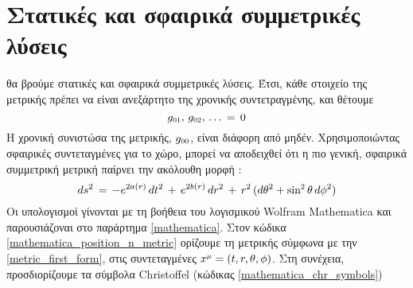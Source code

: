 \section{Στατικές και σφαιρικά συμμετρικές λύσεις}
θα βρούμε στατικές και σφαιρικά συμμετρικές λύσεις. 
Έτσι, κάθε στοιχείο της μετρικής πρέπει να είναι ανεξάρτητο της χρονικής συντετραγμένης, και θέτουμε 
\begin{equation*}
\g{0}{1},\,\g{0}{2},\,\dots\,=\,0
\end{equation*}
Η χρονική συνιστώσα της μετρικής, $\g{0}{0}$, είναι διάφορη από μηδέν. 
Χρησιμοποιώντας σφαιρικές συντεταγμένες για το χώρο, μπορεί να αποδειχθεί ότι η πιο γενική, σφαιρικά συμμετρική μετρική παίρνει την ακόλουθη μορφή \cite{Weinberg:100595}: 
\begin{equation}\label{metric_first_form}
    ds^2 \,=\, -e^{2a(r)}\,dt^2 \,+\, e^{2b(r)}\,dr^2 \,+\, r^2\,(d\theta^2 + \sin\superscr{2}\theta\,d\phi^2)
\end{equation}
Οι υπολογισμοί γίνονται με τη βοήθεια του λογισμικού Wolfram Mathematica και παρουσιάζοναι στο παράρτημα \ref{mathematica}. Στον κώδικα \ref{mathematica_position_n_metric} ορίζουμε τη μετρικής σύμφωνα με την \eqref{metric_first_form}, στις συντεταγμένες $x\superscr{\mu}=(t,r,\theta,\phi)$. Στη συνέχεια, προσδιορίζουμε τα σύμβολα Christoffel (κώδικας \ref{mathematica_chr_symbols})

